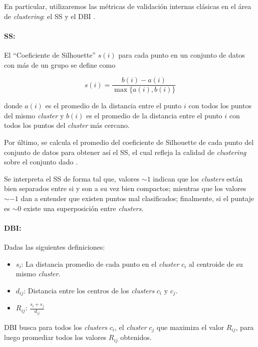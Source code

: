En particular, utilizaremos las métricas de validación internas clásicas en el área de \textit{clustering}: el \gls{SS} \citep{aranganayagi2007clustering} y el \gls{DBI} \citep{davies1979cluster}.

\paragraph{\acrfull{SS}:}

El ``Coeficiente de Silhouette'' $s(i)$ para cada punto en un conjunto de datos con más de un grupo se define como

$$
    s(i)={\frac {b(i)-a(i)}{\max\{a(i), b(i)\}}}
$$

\noindent donde $a(i)$  es el promedio de la distancia entre el punto $i$ con todos los puntos del mismo \textit{cluster} y $b(i)$  es el promedio de la distancia entre el punto $i$ con todos los puntos del \textit{cluster} más cercano.

Por último, se calcula el promedio del coeficiente de Silhouette de cada punto del conjunto de datos para obtener así el \gls{SS}, el cual refleja la calidad de \textit{clustering} sobre el conjunto dado \citep{rousseeuw1987silhouettes}.

Se interpreta el \gls{SS} de forma tal que, valores $\sim 1$ indican que los \textit{clusters} están bien separados entre si y son a su vez bien compactos; mientras que los valores $\sim -1$ dan a entender que existen puntos mal clasificados; finalmente, si el puntaje es $\sim 0$ existe una superposición entre \textit{clusters}.

\paragraph{\acrfull{DBI}:} 

Dadas las siguientes definiciones:
\begin{itemize}
    \item $s_i$: La distancia promedio de cada punto en el \textit{cluster} $c_i$ al centroide de su mismo \textit{cluster}.
    \item $d_{ij}$: Distancia entre los centros de los \textit{clusters} $c_i$ y $c_j$.
    \item $R_{ij}$: $\frac{s_i + s_j}{d_{ij}}$
\end{itemize}

\gls{DBI} busca para todos los \textit{clusters} $c_i$, el \textit{cluster} $c_j$ que maximiza el valor $R_{ij}$, para luego promediar todos los valores $R_{ij}$ obtenidos.


